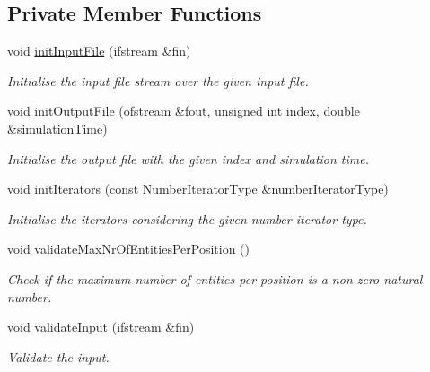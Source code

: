 \subsection*{\-Private \-Member \-Functions}
\begin{DoxyCompactItemize}
\item 
void \hyperlink{classmultiscale_1_1video_1_1RectangularEntityCsvToInputFilesConverter_a8b941e496ad19065d2bd0a3a1b21c47d}{init\-Input\-File} (ifstream \&fin)
\begin{DoxyCompactList}\small\item\em \-Initialise the input file stream over the given input file. \end{DoxyCompactList}\item 
void \hyperlink{classmultiscale_1_1video_1_1RectangularEntityCsvToInputFilesConverter_a08a817f0907a22cf7588ca43efa82ea7}{init\-Output\-File} (ofstream \&fout, unsigned int index, double \&simulation\-Time)
\begin{DoxyCompactList}\small\item\em \-Initialise the output file with the given index and simulation time. \end{DoxyCompactList}\item 
void \hyperlink{classmultiscale_1_1video_1_1RectangularEntityCsvToInputFilesConverter_a423a02139612b26846f17d24b50e4740}{init\-Iterators} (const \hyperlink{namespacemultiscale_a6ef911f4d48a4bf5e657c237ec169ff5}{\-Number\-Iterator\-Type} \&number\-Iterator\-Type)
\begin{DoxyCompactList}\small\item\em \-Initialise the iterators considering the given number iterator type. \end{DoxyCompactList}\item 
void \hyperlink{classmultiscale_1_1video_1_1RectangularEntityCsvToInputFilesConverter_ad5ab0bd1650a0e381cc155c0f97e2493}{validate\-Max\-Nr\-Of\-Entities\-Per\-Position} ()
\begin{DoxyCompactList}\small\item\em \-Check if the maximum number of entities per position is a non-\/zero natural number. \end{DoxyCompactList}\item 
void \hyperlink{classmultiscale_1_1video_1_1RectangularEntityCsvToInputFilesConverter_a0726af8634c9553cd90921d00e4a9b91}{validate\-Input} (ifstream \&fin)
\begin{DoxyCompactList}\small\item\em \-Validate the input. \end{DoxyCompactList}\item 

\end{DoxyCompactItemize}
